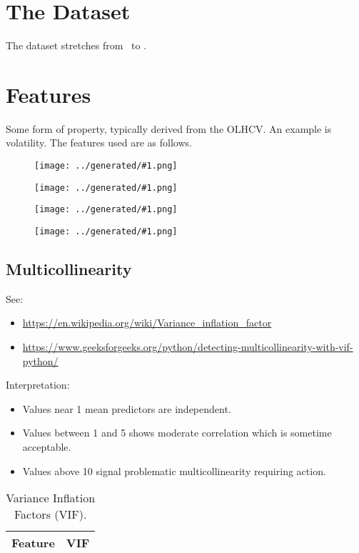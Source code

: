 \documentclass[a4paper]{article}
\newcommand{\figureTau}[1]{
    \begin{figure}[H]
        \begin{center}
            \texttt{[image: ../generated/\#1.png]}
        \end{center}
    \end{figure}
}
\begin{document}
\section{The Dataset}

The dataset stretches from \constantStartdate \  to \constantEnddate.

\section{Features}

Some form of property, typically derived from the OLHCV. An example is
volatility. The features used are as follows.

\figureTau{feature_BollingerBands}

\figureTau{feature_RSI}

\figureTau{pearsonmatrix}

\figureTau{spearmanmatrix}


\subsection{Multicollinearity}

See:

\begin{itemize}
    \item \url{https://en.wikipedia.org/wiki/Variance_inflation_factor}
    \item \url{https://www.geeksforgeeks.org/python/detecting-multicollinearity-with-vif-python/}
\end{itemize}

\noindent
Interpretation:

\begin{itemize}
    \item Values near 1 mean predictors are independent.
    \item Values between 1 and 5 shows moderate correlation which is sometime acceptable.
    \item Values above 10 signal problematic multicollinearity requiring action.
\end{itemize}

\begin{table}[H]
\begin{center}
\caption{Variance Inflation Factors (VIF).}
    \begin{tabular}{|l|l| }
        \hline
        Feature & VIF \\
        \hline

        

        \hline

    \end{tabular}
\end{center}
\end{table}
\end{document}
